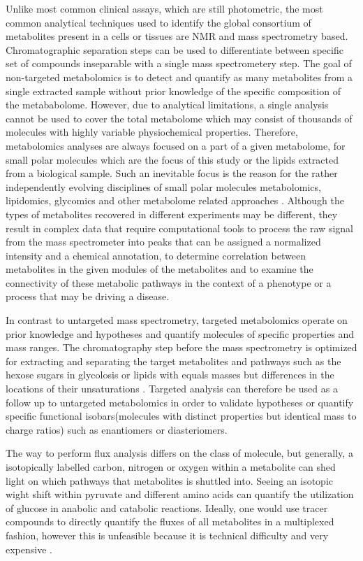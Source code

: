 \documentclass[a4paper,11pt,twoside]{book}
\begin{document}
	Unlike most common clinical assays, which are still photometric, the most common analytical techniques used to identify the global consortium of metabolites present in a cells or tissues are NMR and mass spectrometry based\citep{StanfordBloodTests}. Chromatographic separation steps can be used to differentiate between specific set of compounds inseparable with a single mass spectrometery step. The goal of non-targeted metabolomics is to detect and quantify as many metabolites from a single extracted sample without prior knowledge of the specific composition of the metababolome. However, due to analytical limitations, a single analysis cannot be used to cover the total metabolome which may consist of thousands of molecules with highly variable physiochemical properties. Therefore, metabolomics analyses are always focused on a part of a given metabolome, for small polar molecules which are the focus of this study or the lipids extracted from a biological sample\citep{Villas-BasSamplingPreparation}. Such an inevitable focus is the reason for the rather independently evolving disciplines of small polar molecules metabolomics, lipidomics, glycomics and other metabolome related approaches \citep{FGCZ2017MetabolomicsZurich}. Although the types of metabolites recovered in different experiments may be different, they result in complex data that require computational tools to process the raw signal from the mass spectrometer into peaks that can be assigned a normalized intensity and a chemical annotation, to determine correlation between metabolites in the given modules of the metabolites and to examine the connectivity of these metabolic pathways in the context of a phenotype or a process that may be driving a disease\citep{Aksenov2017GlobalSpectrometry}.
	
	In contrast to untargeted mass spectrometry, targeted metabolomics operate on prior knowledge and hypotheses and quantify molecules of specific properties and mass ranges. The chromatography step before the mass spectrometry is optimized for extracting and separating the target metabolites and pathways such as the hexose sugars in glycolosis or lipids with equals masses but differences in the locations of their unsaturations \citep{Cani2009}. Targeted analysis can therefore be used as a follow up to untargeted metabolomics in order to validate hypotheses or quantify specific functional isobars(molecules with distinct  properties but identical mass to charge ratios) such as enantiomers or diasteriomers.
	
	The way to perform flux analysis differs on the class of molecule, but generally, a isotopically labelled carbon, nitrogen or oxygen within a metabolite can shed light on which pathways that metabolites is shuttled into\citep{Zamboni200913C-basedAnalysis}. Seeing an isotopic wight shift within pyruvate and different amino acids can quantify the utilization of glucose in anabolic and catabolic reactions. Ideally, one would use tracer compounds to directly quantify the fluxes of all metabolites in a multiplexed fashion, however this is unfeasible because it is technical difficulty and very expensive \citep{Zamboni200913C-basedAnalysis}. 
	
\end{document}
